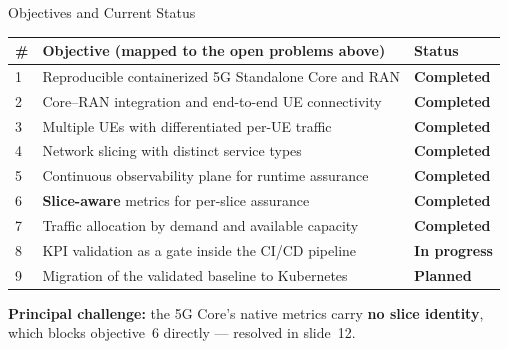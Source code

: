 \documentclass[aspectratio=169,11pt]{beamer}
\newcommand{\done}{{\color{okGreen}\textbf{Completed}}}
\newcommand{\prog}{{\color{warnAmber}\textbf{In progress}}}
\newcommand{\pend}{{\color{softGrey}\textbf{Planned}}}
\begin{document}
\begin{frame}{Objectives and Current Status}
  \scriptsize
  \renewcommand{\arraystretch}{1.18}
  \setlength{\tabcolsep}{4pt}
  \begin{tabular}{@{}p{}p{}l@{}}
    \toprule
    \textbf{\#} & \textbf{Objective (mapped to the open problems above)} & \textbf{Status}\\
    \midrule
    1 & Reproducible containerized 5G Standalone Core and RAN & \done\\
    2 & Core--RAN integration and end-to-end UE connectivity & \done\\
    3 & Multiple UEs with differentiated per-UE traffic & \done\\
    4 & Network slicing with distinct service types & \done\\
    5 & Continuous observability plane for runtime assurance & \done\\
    6 & \textbf{Slice-aware} metrics for per-slice assurance & \done\\
    7 & Traffic allocation by demand and available capacity & \done\\
    8 & KPI validation as a gate inside the CI/CD pipeline & \prog\\
    9 & Migration of the validated baseline to Kubernetes & \pend\\
    \bottomrule
  \end{tabular}
  \vspace{1.5mm}
  \begin{center}
    \scriptsize
    \textbf{Principal challenge:} the 5G Core's native metrics carry
    \textbf{no slice identity}, which blocks objective~6 directly
    --- resolved in slide~12.
  \end{center}
\end{frame}
\end{document}
